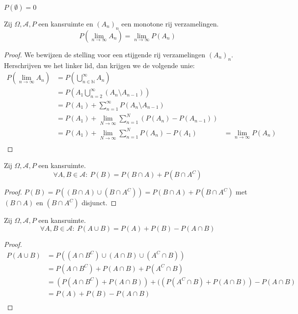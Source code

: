 \documentclass[main.tex]{subfiles}
\begin{document}
\begin{gev}
  $P(\emptyset) = 0$
\end{gev}

\begin{st}
  Zij $\Omega,\mathcal{A},P$ een kansruimte en $(A_{n})_{n}$ een monotone rij verzamelingen.
  \[ P\left( \lim_{n\rightarrow \infty}A_{n} \right) = \lim_{n\rightarrow \infty}P(A_{n}) \]

  \begin{proof}
    We bewijzen de stelling voor een stijgende rij verzamelingen $(A_{n})_{n}$.
    Herschrijven we het linker lid, dan krijgen we de volgende unie:
    \[
    \begin{array}{rll}
      P\left( \lim_{n\rightarrow \infty}A_{n} \right) &= P \left( \bigcup_{n\in \mathbb{N}}^{\infty}A_{n} \right)\\
                                                &= P \left( A_{1} \bigcup_{n=2}^{\infty}(A_{n} \setminus A_{n-1}) \right)\\
                                                &= P(A_{1}) + \sum_{n=1}^{\infty}P(A_{n}\setminus A_{n-1})\\
                                                &= P(A_{1}) + \lim_{N \rightarrow \infty}\sum_{n=1}^{N}(P(A_{n}) - P(A_{n-1}))\\
                                                &= P(A_{1}) + \lim_{N \rightarrow \infty}\sum_{n=1}^{N}P(A_{n}) - P(A_{1}) &= \lim_{n\rightarrow \infty}P(A_{n})\\
    \end{array}
    \]
  \end{proof}
\end{st}

\begin{ei}
  Zij $\Omega,\mathcal{A},P$ een kansruimte.
  \[ \forall A,B \in \mathcal{A}:\ P(B) = P(B \cap A) + P(B \cap A^{C}) \]

  \begin{proof}
    $P(B) = P((B \cap A) \cup (B \cap A^{C})) = P(B \cap A) + P(B \cap A^{C})$ met $(B \cap A)$ en $(B \cap A^{C})$ disjunct.
  \end{proof}
\end{ei}

\begin{ei}
  Zij $\Omega,\mathcal{A},P$ een kansruimte.
  \[ \forall A,B \in \mathcal{A}:\ P(A \cup B) = P(A) + P(B) - P(A \cap B) \]

  \begin{proof}
    \[
    \begin{array}{rll}
      P(A \cup B) &= P((A \cap B^{C}) \cup (A \cap B) \cup (A^{C}\cap B)) \\
                  &= P(A \cap B^{C})+P(A \cap B) +P(A^{C}\cap B)\\
                  &= (P(A \cap B^{C})+P(A \cap B)) +((P(A^{C}\cap B)+P(A \cap B)) -P(A\cap B) \\
                  &= P(A)+P(B) -P(A\cap B)\\
    \end{array}
    \]
  \end{proof}
\end{ei}
\end{document}
